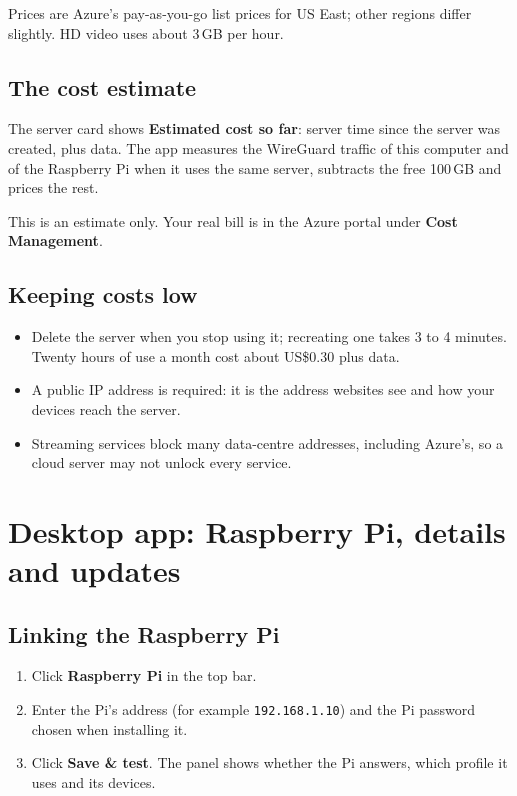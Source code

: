 \documentclass[11pt,a4paper]{article}
\newcommand{\ui}[1]{\textbf{#1}}            %
\newcommand{\file}[1]{\texttt{#1}}          %
\newcommand{\usd}[1]{US\$#1}
\newenvironment{note}{\par\smallskip\noindent\colorbox{notebg}\bgroup\begin{minipage}{\dimexpr\linewidth-2\fboxsep}}{\end{minipage}\egroup\par\smallskip}
\begin{document}
Prices are Azure's pay-as-you-go list prices for US East; other regions differ slightly. HD video uses about 3\,GB per hour.

\subsection{The cost estimate}

The server card shows \ui{Estimated cost so far}: server time since the server was created, plus data. The app measures the WireGuard traffic of this computer and of the Raspberry Pi when it uses the same server, subtracts the free 100\,GB and prices the rest.

\begin{note}
This is an estimate only. Your real bill is in the Azure portal under \ui{Cost Management}.
\end{note}

\subsection{Keeping costs low}

\begin{itemize}
  \item Delete the server when you stop using it; recreating one takes 3 to 4 minutes. Twenty hours of use a month cost about \usd{0.30} plus data.
  \item A public IP address is required: it is the address websites see and how your devices reach the server.
  \item Streaming services block many data-centre addresses, including Azure's, so a cloud server may not unlock every service.
\end{itemize}

\section{Desktop app: Raspberry Pi, details and updates}

\subsection{Linking the Raspberry Pi}

\begin{enumerate}
  \item Click \ui{Raspberry Pi} in the top bar.
  \item Enter the Pi's address (for example \file{192.168.1.10}) and the Pi password chosen when installing it.
  \item Click \ui{Save \& test}. The panel shows whether the Pi answers, which profile it uses and its devices.
\end{enumerate}
\end{document}
